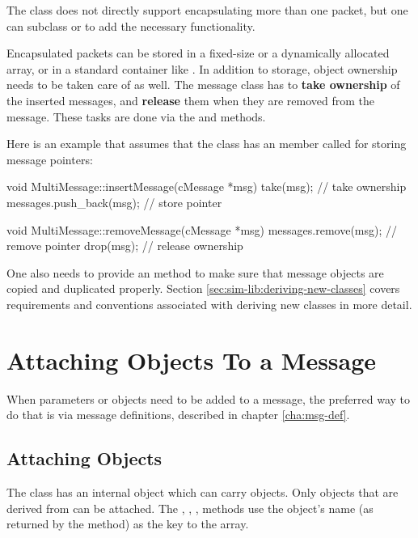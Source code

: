 The  class does not directly support encapsulating more
than one packet, but one can subclass  or 
to add the necessary functionality.

Encapsulated packets can be stored in a fixed-size or a dynamically
allocated array, or in a standard container like .
In addition to storage, object ownership needs to be taken care of as well.
The message class has to \textbf{take ownership} of the inserted messages, and
\textbf{release} them when they are removed from the message. These tasks are
done via the  and  methods.

Here is an example that assumes that the class has an  member
called  for storing message pointers:

\begin{cpp}
void MultiMessage::insertMessage(cMessage *msg)
{
    take(msg);  // take ownership
    messages.push_back(msg);  // store pointer
}

void MultiMessage::removeMessage(cMessage *msg)
{
    messages.remove(msg);  // remove pointer
    drop(msg);  // release ownership
}
\end{cpp}

One also needs to provide an  method to make sure that
message objects are copied and duplicated properly. Section
\ref{sec:sim-lib:deriving-new-classes} covers requirements and conventions
associated with deriving new classes in more detail.



\section{Attaching Objects To a Message}
\label{sec:msgs:attaching-objects}

When parameters or objects need to be added to a message, the preferred
way to do that is via message definitions, described in chapter
\ref{cha:msg-def}.


\subsection{Attaching Objects}
\label{sec:messages:attaching-objects}

The  class has an internal  object which
can carry objects. Only objects that are derived from  can
be attached. The , ,
,  methods use the object's name
(as returned by the  method) as the key to the array.

